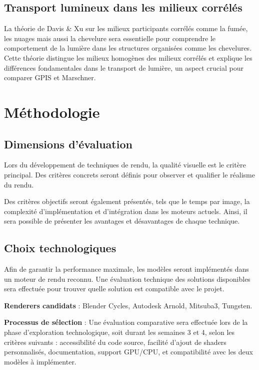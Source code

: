 \documentclass[12pt,a4paper,french]{article}
\begin{document}
\subsection{Transport lumineux dans les milieux corrélés}

La théorie de Davis \& Xu \cite{davis2014generalized} sur les milieux participants corrélés comme la fumée, les nuages mais aussi la chevelure sera essentielle pour comprendre le comportement de la lumière dans les structures organisées comme les chevelures.
Cette théorie distingue les milieux homogènes des milieux corrélés et explique les différences fondamentales dans le transport de lumière, un aspect crucial pour comparer GPIS et Marschner.

\section{Méthodologie}

\subsection{Dimensions d'évaluation}

Lors du développement de techniques de rendu, la qualité visuelle est le critère principal. Des critères concrets seront définis pour observer et qualifier le réalisme du rendu.

Des critères objectifs seront également présentés, tels que le temps par image, la complexité d'implémentation et d'intégration dans les moteurs actuels. Ainsi, il sera possible de présenter les avantages et désavantages de chaque technique.

\subsection{Choix technologiques}

Afin de garantir la performance maximale, les modèles seront implémentés dans un moteur de rendu reconnu. Une évaluation technique des solutions disponibles sera effectuée pour trouver quelle solution est compatible avec le projet.

\textbf{Renderers candidats} : Blender Cycles, Autodesk Arnold, Mitsuba3, Tungsten.

\textbf{Processus de sélection} : Une évaluation comparative sera effectuée lors de la phase d'exploration technologique, soit durant les semaines 3 et 4, selon les critères suivants : accessibilité du code source, facilité d'ajout de shaders personnalisés, documentation, support GPU/CPU, et compatibilité avec les deux modèles à implémenter.
\end{document}
